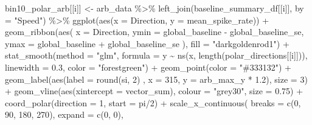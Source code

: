 \documentclass[
]{book}
\newenvironment{Shaded}{\begin{snugshade}}{\end{snugshade}}
\newcommand{\AttributeTok}[1]{\textcolor[rgb]{0.77,0.63,0.00}{#1}}
\newcommand{\DecValTok}[1]{\textcolor[rgb]{0.00,0.00,0.81}{#1}}
\newcommand{\FloatTok}[1]{\textcolor[rgb]{0.00,0.00,0.81}{#1}}
\newcommand{\FunctionTok}[1]{\textcolor[rgb]{0.00,0.00,0.00}{#1}}
\newcommand{\NormalTok}[1]{#1}
\newcommand{\OtherTok}[1]{\textcolor[rgb]{0.56,0.35,0.01}{#1}}
\newcommand{\SpecialCharTok}[1]{\textcolor[rgb]{0.00,0.00,0.00}{#1}}
\newcommand{\StringTok}[1]{\textcolor[rgb]{0.31,0.60,0.02}{#1}}
\begin{document}
\begin{Shaded}
\begin{Highlighting}[]
\NormalTok{  bin10\_polar\_arb[[i]] }\OtherTok{\textless{}{-}}
\NormalTok{    arb\_data }\SpecialCharTok{\%\textgreater{}\%}
    \FunctionTok{left\_join}\NormalTok{(baseline\_summary\_df[[i]], }\AttributeTok{by =} \StringTok{"Speed"}\NormalTok{) }\SpecialCharTok{\%\textgreater{}\%}
    \FunctionTok{ggplot}\NormalTok{(}\FunctionTok{aes}\NormalTok{(}\AttributeTok{x =}\NormalTok{ Direction, }\AttributeTok{y =}\NormalTok{ mean\_spike\_rate)) }\SpecialCharTok{+}
    \FunctionTok{geom\_ribbon}\NormalTok{(}\FunctionTok{aes}\NormalTok{(}
      \AttributeTok{x =}\NormalTok{ Direction,}
      \AttributeTok{ymin =}\NormalTok{ global\_baseline }\SpecialCharTok{{-}}\NormalTok{ global\_baseline\_se,}
      \AttributeTok{ymax =}\NormalTok{ global\_baseline }\SpecialCharTok{+}\NormalTok{ global\_baseline\_se}
\NormalTok{    ),}
    \AttributeTok{fill =} \StringTok{"darkgoldenrod1"}\NormalTok{) }\SpecialCharTok{+}
    \FunctionTok{stat\_smooth}\NormalTok{(}\AttributeTok{method =} \StringTok{"glm"}\NormalTok{,}
                \AttributeTok{formula =}\NormalTok{ y }\SpecialCharTok{\textasciitilde{}} \FunctionTok{ns}\NormalTok{(x, }\FunctionTok{length}\NormalTok{(polar\_directions[[i]])),}
                \AttributeTok{linewidth =} \FloatTok{0.3}\NormalTok{, }\AttributeTok{color =} \StringTok{"forestgreen"}\NormalTok{) }\SpecialCharTok{+}
    \FunctionTok{geom\_point}\NormalTok{(}\AttributeTok{color =} \StringTok{"\#333132"}\NormalTok{) }\SpecialCharTok{+}
    \FunctionTok{geom\_label}\NormalTok{(}\FunctionTok{aes}\NormalTok{(}\AttributeTok{label =} \FunctionTok{round}\NormalTok{(si, }\DecValTok{2}\NormalTok{) , }\AttributeTok{x =} \DecValTok{315}\NormalTok{, }\AttributeTok{y =}\NormalTok{ arb\_max\_y }\SpecialCharTok{*} \FloatTok{1.2}\NormalTok{),}
               \AttributeTok{size =} \DecValTok{3}\NormalTok{) }\SpecialCharTok{+}
    \FunctionTok{geom\_vline}\NormalTok{(}\FunctionTok{aes}\NormalTok{(}\AttributeTok{xintercept =}\NormalTok{ vector\_sum), }\AttributeTok{colour =} \StringTok{"grey30"}\NormalTok{,}
               \AttributeTok{size =} \FloatTok{0.75}\NormalTok{) }\SpecialCharTok{+}
    \FunctionTok{coord\_polar}\NormalTok{(}\AttributeTok{direction =} \DecValTok{1}\NormalTok{, }\AttributeTok{start =}\NormalTok{ pi}\SpecialCharTok{/}\DecValTok{2}\NormalTok{) }\SpecialCharTok{+}
    \FunctionTok{scale\_x\_continuous}\NormalTok{(}
      \AttributeTok{breaks =} \FunctionTok{c}\NormalTok{(}\DecValTok{0}\NormalTok{, }\DecValTok{90}\NormalTok{, }\DecValTok{180}\NormalTok{, }\DecValTok{270}\NormalTok{),}
      \AttributeTok{expand =} \FunctionTok{c}\NormalTok{(}\DecValTok{0}\NormalTok{, }\DecValTok{0}\NormalTok{),}

\end{Highlighting}
\end{Shaded}
\end{document}
